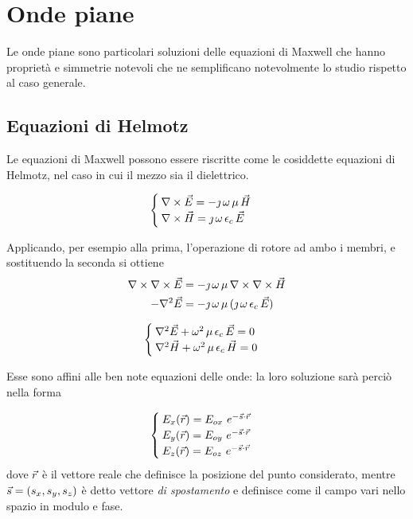 \chapter{Onde piane}
Le onde piane sono particolari soluzioni delle equazioni di Maxwell che hanno proprietà e simmetrie notevoli che ne semplificano notevolmente lo studio rispetto al caso generale.

\section{Equazioni di Helmotz}
	Le equazioni di Maxwell possono essere riscritte come le cosiddette equazioni di Helmotz, nel caso in cui il mezzo sia il dielettrico.

	\begin{equation*}
		\begin{cases}
			\nabla\times\vec{E} = - \jmath \, \omega \, \mu \, \vec{H} \\
			\nabla\times\vec{H} = \jmath \, \omega \, \epsilon_c \, \vec{E} \\
		\end{cases}
	\end{equation*}

	Applicando, per esempio alla prima, l'operazione di rotore ad ambo i membri, e sostituendo la seconda si ottiene
	\begin{equation*}
		\begin{split}
			\nabla\times\nabla\times\vec{E} &= - \jmath \, \omega \, \mu \, \nabla\times \nabla\times\vec{H} \\
			- \nabla^2\vec{E} &= - \jmath \, \omega \, \mu \, (\jmath \, \omega \, \epsilon_c \, \vec{E})\\
		\end{split}
	\end{equation*}

	\begin{equation} \label{eq:helmotz}
		\begin{cases}
			\nabla^2 \vec{E} + \omega^2 \, \mu \, \epsilon_c \, \vec{E} = 0 \\
			\nabla^2 \vec{H} + \omega^2 \, \mu \, \epsilon_c \, \vec{H} = 0
		\end{cases}
	\end{equation}

	Esse sono affini alle ben note equazioni delle onde: la loro soluzione sarà perciò nella forma

	\begin{equation} \label{eq:helmotz_sol}
		\begin{cases}
			E_x(\vec{r}) = E_{ox} ~ e^{-\vec{s} \cdot \vec{r}} \\
			E_y(\vec{r}) = E_{oy} ~ e^{-\vec{s} \cdot \vec{r}} \\
			E_z(\vec{r}) = E_{oz} ~ e^{-\vec{s} \cdot \vec{r}}
		\end{cases}
	\end{equation}
	dove $\vec{r}$ è il vettore reale che definisce la posizione del punto considerato, mentre $\vec{s} = (s_x, s_y, s_z)$ è detto vettore \emph{di spostamento} e definisce come il campo vari nello spazio in modulo e fase.

